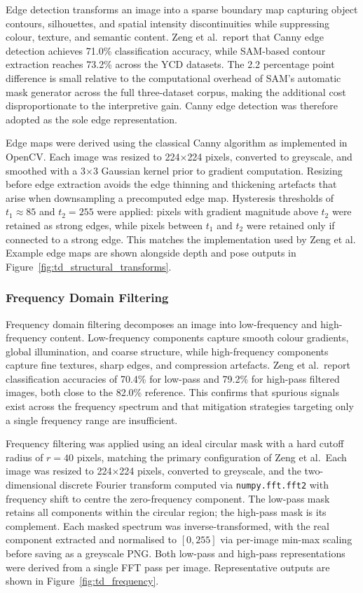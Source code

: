 Edge detection transforms an image into a sparse boundary map capturing object contours, silhouettes, and spatial intensity discontinuities while suppressing colour, texture, and semantic content. Zeng et al.\ report that Canny edge detection achieves 71.0\% classification accuracy, while SAM-based contour extraction reaches 73.2\% across the YCD datasets. The 2.2 percentage point difference is small relative to the computational overhead of SAM's automatic mask generator across the full three-dataset corpus, making the additional cost disproportionate to the interpretive gain. Canny edge detection was therefore adopted as the sole edge representation.

Edge maps were derived using the classical Canny algorithm \cite{Canny_1986_CannyEdgeDetection} as implemented in OpenCV. Each image was resized to 224$\times$224 pixels, converted to greyscale, and smoothed with a 3$\times$3 Gaussian kernel prior to gradient computation. Resizing before edge extraction avoids the edge thinning and thickening artefacts that arise when downsampling a precomputed edge map. Hysteresis thresholds of $t_1 \approx 85$ and $t_2 = 255$ were applied: pixels with gradient magnitude above $t_2$ were retained as strong edges, while pixels between $t_1$ and $t_2$ were retained only if connected to a strong edge. This matches the implementation used by Zeng et al. Example edge maps are shown alongside depth and pose outputs in Figure~\ref{fig:td_structural_transforms}.

\subsubsection{Frequency Domain Filtering}
\label{subsec:frequency_filtering}

Frequency domain filtering decomposes an image into low-frequency and high-frequency content. Low-frequency components capture smooth colour gradients, global illumination, and coarse structure, while high-frequency components capture fine textures, sharp edges, and compression artefacts. Zeng et al.\ report classification accuracies of 70.4\% for low-pass and 79.2\% for high-pass filtered images, both close to the 82.0\% reference. This confirms that spurious signals exist across the frequency spectrum and that mitigation strategies targeting only a single frequency range are insufficient.

Frequency filtering was applied using an ideal circular mask with a hard cutoff radius of $r = 40$ pixels, matching the primary configuration of Zeng et al.\ Each image was resized to 224$\times$224 pixels, converted to greyscale, and the two-dimensional discrete Fourier transform computed via \texttt{numpy.fft.fft2} with frequency shift to centre the zero-frequency component. The low-pass mask retains all components within the circular region; the high-pass mask is its complement. Each masked spectrum was inverse-transformed, with the real component extracted and normalised to $[0, 255]$ via per-image min-max scaling before saving as a greyscale PNG. Both low-pass and high-pass representations were derived from a single FFT pass per image. Representative outputs are shown in Figure~\ref{fig:td_frequency}.

